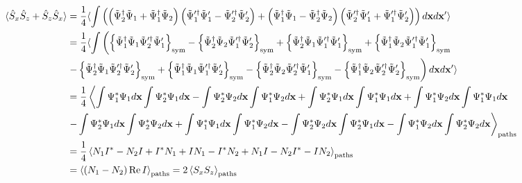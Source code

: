 \begin{equation*}
\begin{split}
	\langle \hat{S}_x \hat{S}_z + \hat{S}_z \hat{S}_x \rangle
	& = \frac{1}{4} \langle \int \left(
		\left(
			\tilde{\Psi}^\dagger_2 \tilde{\Psi}_1 + \tilde{\Psi}^\dagger_1 \tilde{\Psi}_2
		\right)
		\left(
			\tilde{\Psi}^{\prime\dagger}_1 \tilde{\Psi}^\prime_1 - \tilde{\Psi}^{\prime\dagger}_2 \tilde{\Psi}^\prime_2
		\right)
		+ \left(
			\tilde{\Psi}^\dagger_1 \tilde{\Psi}_1 - \tilde{\Psi}^\dagger_2 \tilde{\Psi}_2
		\right)
		\left(
			\tilde{\Psi}^{\prime\dagger}_2 \tilde{\Psi}^\prime_1 + \tilde{\Psi}^{\prime\dagger}_1 \tilde{\Psi}^\prime_2
		\right)
	\right) d\mathbf{x} d\mathbf{x}^\prime \rangle \\
	& = \frac{1}{4} \langle \int \left(
		\left\{  \tilde{\Psi}^\dagger_1 \tilde{\Psi}_1 \tilde{\Psi}^{\prime\dagger}_2 \tilde{\Psi}^\prime_1  \right\}_{\mathrm{sym}}
		- \left\{  \tilde{\Psi}^\dagger_2 \tilde{\Psi}_2 \tilde{\Psi}^{\prime\dagger}_1 \tilde{\Psi}^\prime_2  \right\}_{\mathrm{sym}}
		+ \left\{  \tilde{\Psi}^\dagger_2 \tilde{\Psi}_1 \tilde{\Psi}^{\prime\dagger}_1 \tilde{\Psi}^\prime_1  \right\}_{\mathrm{sym}}
		+ \left\{  \tilde{\Psi}^\dagger_1 \tilde{\Psi}_2 \tilde{\Psi}^{\prime\dagger}_1 \tilde{\Psi}^\prime_1  \right\}_{\mathrm{sym}}
	\right. \\
	& \left.
		- \left\{  \tilde{\Psi}^\dagger_2 \tilde{\Psi}_1 \tilde{\Psi}^{\prime\dagger}_2 \tilde{\Psi}^\prime_2  \right\}_{\mathrm{sym}}
		+ \left\{  \tilde{\Psi}^\dagger_1 \tilde{\Psi}_1 \tilde{\Psi}^{\prime\dagger}_1 \tilde{\Psi}^\prime_2  \right\}_{\mathrm{sym}}
		- \left\{  \tilde{\Psi}^\dagger_2 \tilde{\Psi}_2 \tilde{\Psi}^{\prime\dagger}_2 \tilde{\Psi}^\prime_1  \right\}_{\mathrm{sym}}
		- \left\{  \tilde{\Psi}^\dagger_1 \tilde{\Psi}_2 \tilde{\Psi}^{\prime\dagger}_2 \tilde{\Psi}^\prime_2  \right\}_{\mathrm{sym}}
	\right) d\mathbf{x} d\mathbf{x}^\prime \rangle \\
	& = \frac{1}{4} \left\langle
		\int \Psi^*_1 \Psi_1 d\mathbf{x} \int \Psi^*_2 \Psi_1 d\mathbf{x}
		- \int \Psi^*_2 \Psi_2 d\mathbf{x} \int \Psi^*_1 \Psi_2 d\mathbf{x}
		+ \int \Psi^*_2 \Psi_1 d\mathbf{x} \int \Psi^*_1 \Psi_1 d\mathbf{x}
		+ \int \Psi^*_1 \Psi_2 d\mathbf{x} \int \Psi^*_1 \Psi_1 d\mathbf{x} \right. \\
	&	\left. - \int \Psi^*_2 \Psi_1 d\mathbf{x} \int \Psi^*_2 \Psi_2 d\mathbf{x}
		+ \int \Psi^*_1 \Psi_1 d\mathbf{x} \int \Psi^*_1 \Psi_2 d\mathbf{x}
		- \int \Psi^*_2 \Psi_2 d\mathbf{x} \int \Psi^*_2 \Psi_1 d\mathbf{x}
		- \int \Psi^*_1 \Psi_2 d\mathbf{x} \int \Psi^*_2 \Psi_2 d\mathbf{x}
	\right\rangle_{\mathrm{paths}} \\
	& = \frac{1}{4} \left\langle 
		N_1 I^*
		- N_2 I
		+ I^* N_1
		+ I N_1
		- I^* N_2
		+ N_1 I
		- N_2 I^*
		- I N_2
	 \right\rangle_{\mathrm{paths}} \\
	& = \left\langle  (N_1 - N_2) \operatorname{Re} I  \right\rangle_{\mathrm{paths}} = 2 \left\langle  S_x S_z  \right\rangle_{\mathrm{paths}}
\end{split}
\end{equation*}

